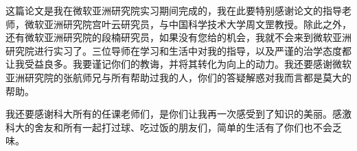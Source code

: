 
\begin{acknowledgements}

这篇论文是我在微软亚洲研究院实习期间完成的，我在此要特别感谢论文的指导老师，微软亚洲研究院宫叶云研究员，与中国科学技术大学周文罡教授。除此之外，还有微软亚洲研究院的段楠研究员，如果没有您给的机会，我就不会来到微软亚洲研究院进行实习了。三位导师在学习和生活中对我的指导，以及严谨的治学态度都让我受益良多。我要谨记你们的教诲，并将其转化为向上的动力。我还要感谢微软亚洲研究院的张航师兄与所有帮助过我的人，你们的答疑解惑对我而言都是莫大的帮助。

我还要感谢科大所有的任课老师们，是你们让我再一次感受到了知识的美丽。感激科大的舍友和所有一起打过球、吃过饭的朋友们，简单的生活有了你们也不会乏味。

\end{acknowledgements}
